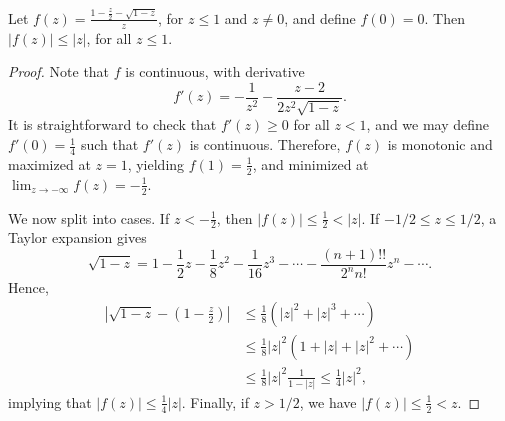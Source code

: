 \documentclass{article}
\begin{document}
\begin{lemma}
\label{lem:sqrt_linearize}
Let $f(z) =  \frac{1 - \frac{z}{2} - \sqrt{ 1 - z}}{z}$, for $z \leq 1$ and $z \neq 0$, and define $f(0) = 0$. Then $\left| f(z)  \right| \leq |z|$, for all $z \leq 1$.
\end{lemma}

\begin{proof}
Note that $f$ is continuous, with derivative
\[
f'(z) = - \frac{1}{z^2} - \frac{z - 2}{2 z^2 \sqrt{1-z}}.
\]
It is straightforward to check that $f'(z) \geq 0$ for all $z < 1$, and we may define $f'(0) = \frac{1}{4}$ such that $f'(z)$ is continuous. Therefore, $f(z)$ is monotonic and maximized at $z = 1$, yielding $f(1) = \frac{1}{2}$, and minimized at $\lim_{z \rightarrow -\infty} f(z) = -\frac{1}{2}$. 

We now split into cases. If $z < -\frac{1}{2}$, then $|f(z)| \leq \frac{1}{2} < |z|$. If $-1/2 \leq z \leq 1/2$, a Taylor expansion gives
\[
\sqrt{1 - z} = 1 - \frac{1}{2} z - \frac{1}{8} z^2 - \frac{1}{16} z^3  - \cdots - \frac{(n+1)!!}{2^n n!} z^n - \cdots.
\]
Hence,
\begin{align*}
\left| \sqrt{1-z} - \left(1 - \frac{z}{2}\right) \right| &\leq
     \frac{1}{8} (|z|^2 + |z|^3 + \cdots ) \\
  &\leq \frac{1}{8} |z|^2 ( 1 + |z| + |z|^2 + \cdots) \\
  &\leq \frac{1}{8} |z|^2 \frac{1}{1 - |z|} \leq \frac{1}{4} |z|^2,
\end{align*}
implying that $|f(z)| \leq \frac{1}{4} |z|$. Finally, if $z > 1/2$, we have  $|f(z)| \leq \frac{1}{2} < z$.
\end{proof}
\end{document}
